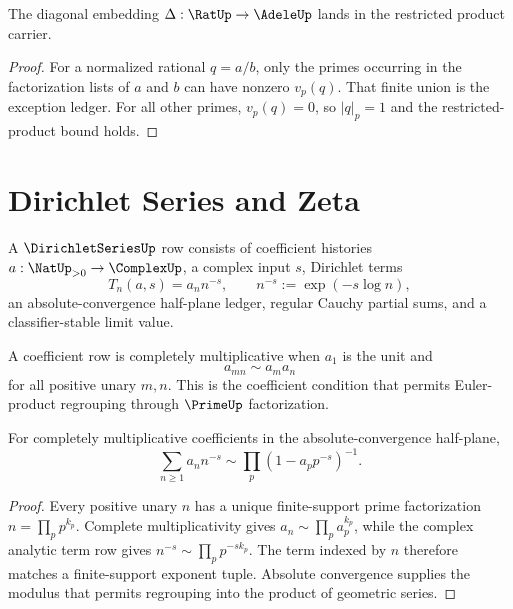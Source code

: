 \begin{theorem}
\label{thm:number-theory-spine-diagonal-rational}
The diagonal embedding $\Delta:\RatUp\to\AdeleUp$ lands in the restricted
product carrier.
\end{theorem}

\begin{proof}
For a normalized rational $q=a/b$, only the primes occurring in the
factorization lists of $a$ and $b$ can have nonzero $v_p(q)$.  That finite
union is the exception ledger.  For all other primes, $v_p(q)=0$, so
$|q|_p=1$ and the restricted-product bound holds.
\end{proof}

\section{Dirichlet Series and Zeta}
\label{sec:number-theory-spine-dirichlet-zeta}

\begin{definition}
\label{def:number-theory-spine-dirichlet}
A $\DirichletSeriesUp$ row consists of coefficient histories
$a:\NatUp_{>0}\to\ComplexUp$, a complex input $s$, Dirichlet terms
$$
T_n(a,s)=a_n n^{-s},
\qquad
n^{-s}:=\exp(-s\log n),
$$
an absolute-convergence half-plane ledger, regular Cauchy partial sums, and a
classifier-stable limit value.
\end{definition}

\begin{definition}
\label{def:number-theory-spine-completely-multiplicative}
A coefficient row is completely multiplicative when $a_1$ is the unit and
$$
a_{mn}\sim a_m a_n
$$
for all positive unary $m,n$.  This is the coefficient condition that permits
Euler-product regrouping through $\PrimeUp$ factorization.
\end{definition}

\begin{theorem}
\label{thm:number-theory-spine-euler-product}
For completely multiplicative coefficients in the absolute-convergence
half-plane,
$$
\sum_{n\ge1}a_n n^{-s}
\sim
\prod_p(1-a_p p^{-s})^{-1}.
$$
\end{theorem}

\begin{proof}
Every positive unary $n$ has a unique finite-support prime factorization
$n=\prod_p p^{k_p}$.  Complete multiplicativity gives
$a_n\sim\prod_p a_p^{k_p}$, while the complex analytic term row gives
$n^{-s}\sim\prod_p p^{-s k_p}$.  The term indexed by $n$ therefore matches a
finite-support exponent tuple.  Absolute convergence supplies the modulus
that permits regrouping into the product of geometric series.
\end{proof}

